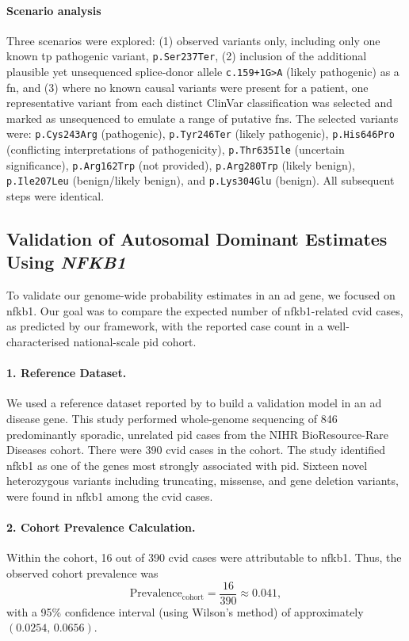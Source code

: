 \paragraph{Scenario analysis}
Three scenarios were explored:  
(1) observed variants only, including only one known \ac{tp} pathogenic variant, \texttt{p.Ser237Ter}, 
(2) inclusion of the additional plausible yet unsequenced splice‑donor allele \texttt{c.159+1G{\small\textgreater}A} (likely pathogenic) as a \ac{fn}, and 
(3) where no known causal variants were present for a patient, one representative variant from each distinct ClinVar classification was selected and marked as unsequenced to emulate a range of putative \acp{fn}. The selected variants were: \texttt{p.Cys243Arg} (pathogenic), \texttt{p.Tyr246Ter} (likely pathogenic), \texttt{p.His646Pro} (conflicting interpretations of pathogenicity), \texttt{p.Thr635Ile} (uncertain significance), \texttt{p.Arg162Trp} (not provided), \texttt{p.Arg280Trp} (likely benign), \texttt{p.Ile207Leu} (benign/likely benign), and \texttt{p.Lys304Glu} (benign). 
All subsequent steps were identical.

\subsection{Validation of Autosomal Dominant Estimates Using \textit{NFKB1}}

To validate our genome-wide probability estimates in an \ac{ad} gene, we focused on \ac{nfkb1}. 
Our goal was to compare the expected number of \ac{nfkb1}-related \ac{cvid} cases, as predicted by our framework, with the reported case count in a well-characterised national-scale \ac{pid} cohort.

\paragraph{1. Reference Dataset.}
We used a reference dataset reported by \citet{tuijnenburgNFKB12018} to build a validation model in an \ac{ad} disease gene. This study performed whole‐genome sequencing of 846 predominantly sporadic, unrelated \ac{pid} cases from the NIHR BioResource-Rare Diseases cohort. There were 390 \ac{cvid} cases in the cohort. The study identified \ac{nfkb1} as one of the genes most strongly associated with \ac{pid}. Sixteen novel heterozygous variants including truncating, missense, and gene deletion variants, were found in \ac{nfkb1} among the \ac{cvid} cases.

\paragraph{2. Cohort Prevalence Calculation.}
Within the cohort, 16 out of 390 \ac{cvid} cases were attributable to \ac{nfkb1}. Thus, the observed cohort prevalence was
\[
\text{Prevalence}_{\text{cohort}} = \frac{16}{390} \approx 0.041,
\]
with a 95\% confidence interval (using Wilson's method) of approximately \((0.0254,\,0.0656)\).

